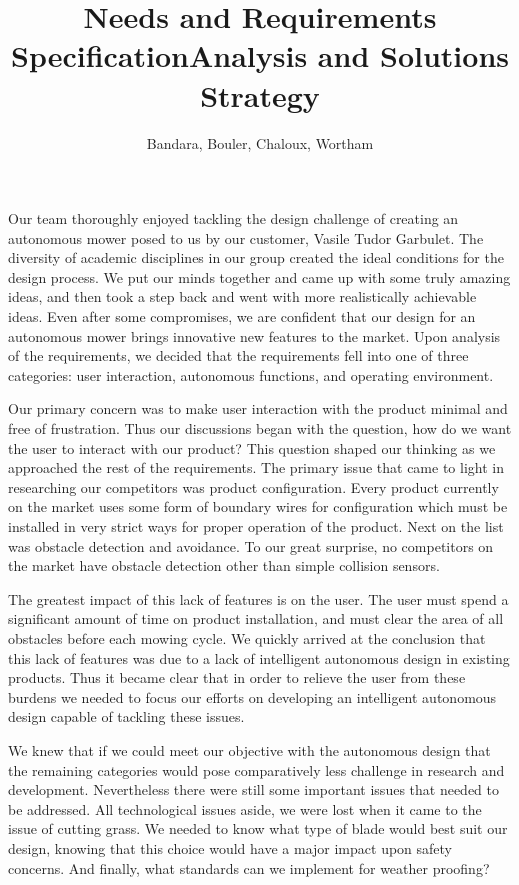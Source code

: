 \documentclass[12pt,letterpaper]{article}
\author{Bandara, Bouler, Chaloux, Wortham}
\title{Needs and Requirements Specification}
\title{Analysis and Solutions Strategy}
\begin{document}
\reqstitlepage
{}
\setcounter{page}{1}

Our team thoroughly enjoyed tackling the design challenge of creating an
autonomous mower posed to us by our customer, Vasile Tudor Garbulet. The
diversity of academic disciplines in our group created the ideal conditions for
the design process.  We put our minds together and came up with some truly
amazing ideas, and then took a step back and went with more realistically
achievable ideas.  Even after some compromises, we are confident that our design
for an autonomous mower brings innovative new features to the market.  Upon
analysis of the requirements, we decided that the requirements fell into one of
three categories:  user interaction, autonomous functions, and operating
environment.

Our primary concern was to make user interaction with the product minimal and
free of frustration.  Thus our discussions began with the question, how do we
want the user to interact with our product?  This question shaped our thinking
as we approached the rest of the requirements.  The primary issue that came to
light in researching our competitors was product configuration.  Every product
currently on the market uses some form of boundary wires for configuration which
must be installed in very strict ways for proper operation of the product.  Next
on the list was obstacle detection and avoidance.  To our great surprise, no
competitors on the market have obstacle detection other than simple collision
sensors.

The greatest impact of this lack of features is on the user.  The user must
spend a significant amount of time on product installation, and must clear the
area of all obstacles before each mowing cycle.  We quickly arrived at the
conclusion that this lack of features was due to a lack of intelligent
autonomous design in existing products.  Thus it became clear that in order to
relieve the user from these burdens we needed to focus our efforts on developing
an intelligent autonomous design capable of tackling these issues.

We knew that if we could meet our objective with the autonomous design that the
remaining categories would pose comparatively less challenge in research and
development.  Nevertheless there were still some important issues that needed to
be addressed. All technological issues aside, we were lost when it came to the
issue of cutting grass.  We needed to know what type of blade would best suit
our design, knowing that this choice would have a major impact upon safety
concerns.  And finally, what standards can we implement for weather proofing?
\end{document}
